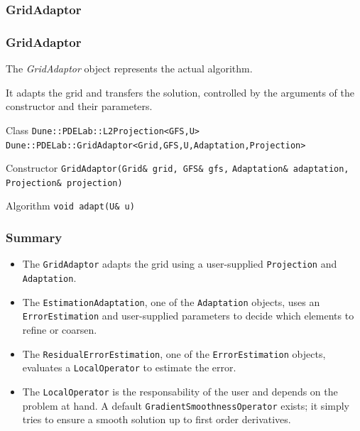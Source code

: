 \subsubsection*{GridAdaptor}

\begin{frame}[fragile]
  \frametitle<presentation>{GridAdaptor}
  The \emph{GridAdaptor} object represents the actual algorithm.

  It adapts the grid and transfers the solution, controlled by the arguments of the constructor and their parameters.

  \pause

  \begin{block}{Class}
    \lstinline{Dune::PDELab::L2Projection<GFS,U>}
    \lstinline{Dune::PDELab::GridAdaptor<Grid,GFS,U,Adaptation,Projection>}
  \end{block}

  \pause

  \begin{block}{Constructor}
    \lstinline{GridAdaptor(Grid& grid, GFS& gfs,}
    \lstinline{Adaptation& adaptation, Projection& projection)}
  \end{block}

  \begin{block}{Algorithm}
    \lstinline{void adapt(U& u)}
  \end{block}

\end{frame}

\begin{frame}
  \frametitle{Summary}
  \begin{itemize}
    \item The \lstinline{GridAdaptor} adapts the grid using a user-supplied \lstinline{Projection} and \lstinline{Adaptation}.

      \pause

    \item The \lstinline{EstimationAdaptation}, one of the \lstinline{Adaptation} objects, uses an \lstinline{ErrorEstimation} and user-supplied parameters to decide which elements to refine or coarsen.

      \pause

    \item The \lstinline{ResidualErrorEstimation}, one of the \lstinline{ErrorEstimation} objects, evaluates a \lstinline{LocalOperator} to estimate the error.

      \pause

    \item The \lstinline{LocalOperator} is the responsability of the user and depends on the problem at hand. A default \lstinline{GradientSmoothnessOperator} exists; it simply tries to ensure a smooth solution up to first order derivatives.
  \end{itemize}
\end{frame}

